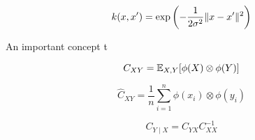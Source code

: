 \begin{equation}
  k(x,x') = \exp\left(-\frac{1}{2\sigma^2} \lVert x-x'\rVert^2 \right)
\end{equation}

An important concept t

\begin{equation}
  C_{XY} = \mathbb{E}_{X, Y}[\phi(X) \otimes \phi(Y)]
\end{equation}

\begin{equation}
  \widehat{C}_{XY} = \frac{1}{n} \sum_{i=1}^n \phi(x_i) \otimes \phi(y_i)
\end{equation}

\begin{equation}
  C_{Y \mid X} = C_{YX} C_{XX}^{-1}
\end{equation}
